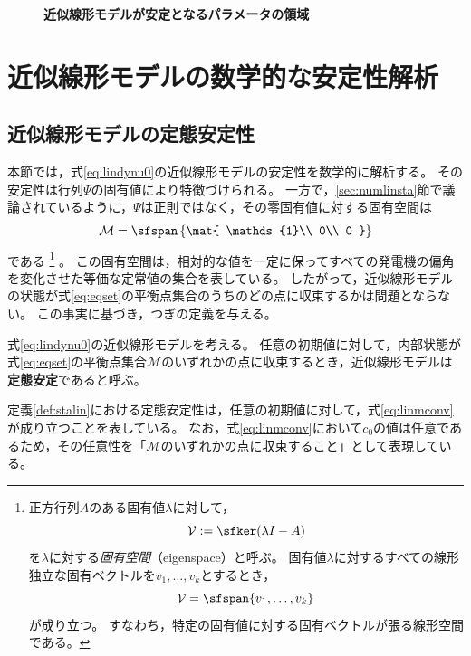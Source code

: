 \documentclass[tombow,dvipdfmx]{corona-a5-1.1}
\begin{document}
\begin{figure}[t!]
{    
}
 \medskip
 \caption{\textbf{近似線形モデルが安定となるパラメータの領域}}
 \label{fig:gamsta}
\medskip
\end{figure}


\section{近似線形モデルの数学的な安定性解析\advanced}\label{sec:linmathana}

\subsection{近似線形モデルの定態安定性\advanced}

本節では，式\ref{eq:lindynu0}の近似線形モデルの安定性を数学的に解析する。
その安定性は行列$\Psi$の固有値により特徴づけられる。
一方で，\ref{sec:numlinsta}節で議論されているように，$\Psi$は正則ではなく，その零固有値に対する固有空間は
\begin{align}\label{eq:eqset}
\mathcal{M} =
 \sfspan\left\{
 \mat{
 \mathds{1}\\
 0\\
 0
 }
 \right\}
\end{align}
である
\footnote{
正方行列$A$のある固有値$\lambda$に対して，
\[
\mathcal{V}:= \sfker (\lambda I -A)
\]
を$\lambda$に対する\emph{固有空間}（eigenspace）と呼ぶ。
固有値$\lambda$に対するすべての線形独立な固有ベクトルを$v_1,\ldots,v_k$とするとき，
\[
\mathcal{V} = \sfspan\{v_1,\ldots,v_k\}
\]
が成り立つ。
すなわち，特定の固有値に対する固有ベクトルが張る線形空間である。
}
。
この固有空間は，相対的な値を一定に保ってすべての発電機の偏角を変化させた等価な定常値の集合を表している。
したがって，近似線形モデルの状態が式\ref{eq:eqset}の平衡点集合のうちのどの点に収束するかは問題とならない。
この事実に基づき，つぎの定義を与える。

\begin{定義}[近似線形モデルの定態安定性]
\label{def:stalin}
式\ref{eq:lindynu0}の近似線形モデルを考える。
任意の初期値に対して，内部状態が式\ref{eq:eqset}の平衡点集合$\mathcal{M}$のいずれかの点に収束するとき，近似線形モデルは\textbf{定態安定}であると呼ぶ。
\end{定義}

定義\ref{def:stalin}における定態安定性は，任意の初期値に対して，式\ref{eq:linmconv}が成り立つことを表している。
なお，式\ref{eq:linmconv}において$c_0$の値は任意であるため，その任意性を「$\mathcal{M}$のいずれかの点に収束すること」として表現している。
\end{document}
